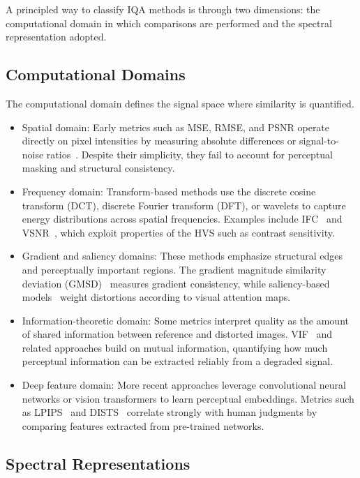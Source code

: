 A principled way to classify \acs{IQA} methods is through two dimensions: the computational domain in which comparisons are performed and the spectral representation adopted.

\subsection{Computational Domains}

The computational domain defines the signal space where similarity is quantified.

\begin{itemize}
  \item Spatial domain: Early metrics such as MSE, RMSE, and PSNR operate directly on pixel intensities by measuring absolute differences or signal-to-noise ratios~\cite{gonzalez2009digital}. Despite their simplicity, they fail to account for perceptual masking and structural consistency.
  \item Frequency domain: Transform-based methods use the discrete cosine transform (DCT), discrete Fourier transform (DFT), or wavelets to capture energy distributions across spatial frequencies. Examples include IFC~\cite{sheikh2005ifc} and VSNR~\cite{chandler2007vsnr}, which exploit properties of the \acs{HVS} such as contrast sensitivity.
  \item Gradient and saliency domains: These methods emphasize structural edges and perceptually important regions. The gradient magnitude similarity deviation (GMSD)~\cite{xue2014gmsd} measures gradient consistency, while saliency-based models~\cite{hou2007saliency} weight distortions according to visual attention maps.
  \item Information-theoretic domain: Some metrics interpret quality as the amount of shared information between reference and distorted images. VIF~\cite{sheikh2006vif} and related approaches build on mutual information, quantifying how much perceptual information can be extracted reliably from a degraded signal.
  \item Deep feature domain: More recent approaches leverage convolutional neural networks or vision transformers to learn perceptual embeddings. Metrics such as LPIPS~\cite{zhang2018lpips} and DISTS~\cite{ding2020dists} correlate strongly with human judgments by comparing features extracted from pre-trained networks.
\end{itemize}

\subsection{Spectral Representations}

